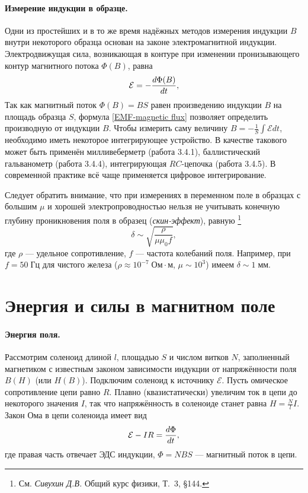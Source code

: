 \paragraph{Измерение индукции в образце.}
Одни из простейших и в то же время надёжных методов измерения
индукции $B$ внутри некоторого образца основан
на законе электромагнитной индукции.
Электродвижущая сила, возникающая в контуре при изменении
пронизывающего контур магнитного потока $\Phi(B)$, равна
\begin{equation}
	\eqmark{EMF-magnetic flux}
	\mathcal{E} = - \frac{d\Phi (B)}{dt},
\end{equation}
Так как магнитный поток $\Phi (B)=BS$ равен произведению индукции $B$ на площадь
образца $S$, формула \eqref{EMF-magnetic flux} позволяет определить производную от
индукции $B$. Чтобы измерить саму величину $B=-\frac1{S}\int \mathcal{E} dt$,
необходимо иметь некоторое интегрирующее устройство.
В качестве такового может быть применён милливеберметр (работа 3.4.1),
баллистический гальванометр (работа 3.4.4), интегрирующая $RC$-цепочка
(работа 3.4.5). В современной практике всё чаще применяется цифровое интегрирование.

Следует обратить внимание, что при измерениях в переменном поле
в образцах с большим $\mu$ и хорошей электропроводностью
нельзя не учитывать конечную глубину
проникновения поля в образец (\emph{скин-эффект}), равную%
\footnote{См. \textit{Сивухин Д.В.} Общий курс физики, Т.~3, \S 144.}
\[
\delta \sim \sqrt{\frac{\rho}{\mu \mu_0 f}},
\]
где $\rho$ --- удельное сопротивление, $f$ --- частота колебаний поля.
Например, при $f=50\;Гц$ для чистого железа ($\rho \approx 10^{-7}\;Ом\cdot м$,
$\mu \sim 10^3$) имеем $\delta \sim 1\;мм$.


\section{Энергия и силы в магнитном поле}
\label{sec:forces}

\paragraph{Энергия поля.}
Рассмотрим соленоид длиной $l$, площадью $S$ и числом витков $N$,
заполненный магнетиком с известным законом зависимости индукции от напряжённости
поля $B(H)$ (или $H(B)$). Подключим соленоид к источнику $\mathcal{E}$.
Пусть омическое сопротивление цепи равно $R$.
Плавно (квазистатически) увеличим ток в цепи до некоторого значения
$I$, так что напряжённость в соленоиде станет равна
$H = \frac{N}{l} I$. Закон Ома в цепи соленоида имеет вид
\begin{equation}
    \eqmark{OhmLaw-solenoid}
\mathcal{E} - IR = \frac{d\Phi}{dt},
\end{equation}
где правая часть отвечает ЭДС индукции, $\Phi = NBS$ --- магнитный поток в
цепи.

